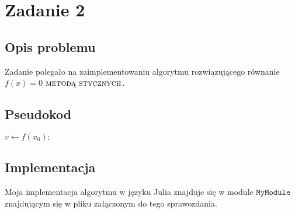 \section{Zadanie 2}
\subsection{Opis problemu}
Zadanie polegało na zaimplementowaniu algorytmu rozwiązującego równanie $ f(x) = 0 $ $\textsc{metodą stycznych} $.
\subsection{Pseudokod}
\begin{algorithm}[H]
  $v \leftarrow f(x_0);$\\
\end{algorithm}
\subsection{Implementacja}
Moja implementacja algorytmu w języku Julia znajduje się w module $ \texttt{MyModule} $ znajdującym się w pliku załączonym do tego sprawozdania.